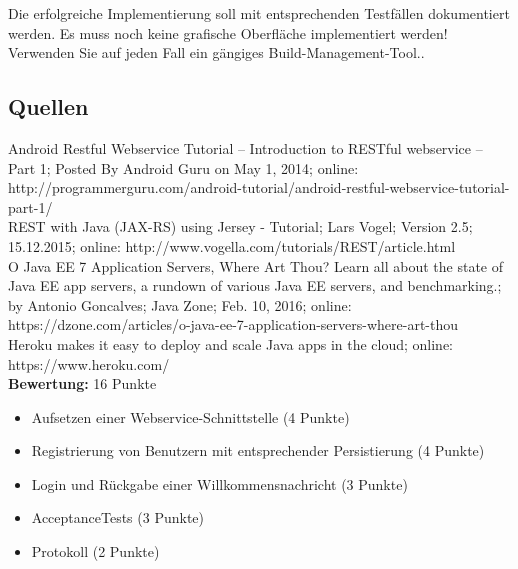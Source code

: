 Die erfolgreiche Implementierung soll mit entsprechenden Testfällen dokumentiert werden. Es muss noch keine grafische Oberfläche implementiert werden! Verwenden Sie auf jeden Fall ein gängiges Build-Management-Tool..
\clearpage

\subsection{Quellen}

Android Restful Webservice Tutorial – Introduction to RESTful webservice – Part 1; Posted By Android Guru on May 1, 2014; online: http://programmerguru.com/android-tutorial/android-restful-webservice-tutorial-part-1/\\
REST with Java (JAX-RS) using Jersey - Tutorial; Lars Vogel; Version 2.5; 15.12.2015; online: http://www.vogella.com/tutorials/REST/article.html\\
O Java EE 7 Application Servers, Where Art Thou? Learn all about the state of Java EE app servers, a rundown of various Java EE servers, and benchmarking.; by Antonio Goncalves; Java Zone; Feb. 10, 2016; online: https://dzone.com/articles/o-java-ee-7-application-servers-where-art-thou\\
Heroku makes it easy to deploy and scale Java apps in the cloud; online: https://www.heroku.com/\\

\textbf{Bewertung:} 16 Punkte
\renewcommand{\labelitemi}{$-$}
\begin{itemize}
	\item Aufsetzen einer Webservice-Schnittstelle (4 Punkte)
	\item Registrierung von Benutzern mit entsprechender Persistierung (4 Punkte)
	\item Login und Rückgabe einer Willkommensnachricht (3 Punkte)
	\item AcceptanceTests (3 Punkte)
	\item Protokoll (2 Punkte)
\end{itemize}
\clearpage
